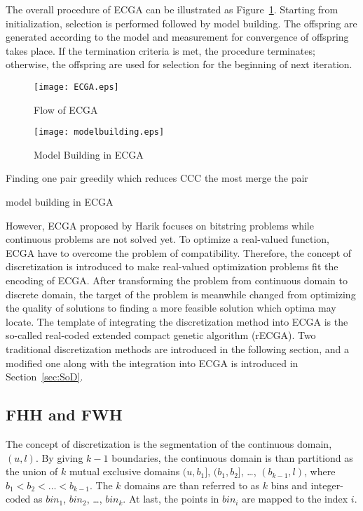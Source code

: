 The overall procedure of ECGA can be illustrated as Figure~\ref{fig:ecgaflow}.
Starting from initialization, selection is performed followed by model
building.
The offspring are generated according to the model and measurement for
convergence of offspring takes place.
If the termination criteria is met, the procedure terminates; otherwise,
the offspring are used for selection for the beginning of next
iteration.

\begin{figure}[htpb]
  \centering
  \texttt{[image: ECGA.eps]}
  \caption{Flow of ECGA}
  \label{fig:ecgaflow}
\end{figure}

\begin{figure}[htpb]
  \centering
  \texttt{[image: modelbuilding.eps]}
  \caption{Model Building in ECGA}
  \label{fig:model building}
\end{figure}
\begin{algorithm}    { Finding one pair greedily which reduces CCC
    the most \; merge the pair\; } \caption{model building in ECGA}
    \label{algo:ecga}
  \end{algorithm}

However, ECGA proposed by Harik focuses on bitstring problems while
continuous problems are not solved yet.  To optimize a real-valued
function, ECGA have to overcome the problem of compatibility.
Therefore, the concept of discretization is introduced to make
real-valued optimization problems fit the encoding of ECGA.  After
transforming the problem from continuous domain to discrete domain, the
target of the problem is meanwhile changed from optimizing the quality
of solutions to finding a more feasible solution which optima may
locate.  The template of integrating the discretization method into ECGA
is the so-called real-coded extended compact genetic algorithm (rECGA).
Two traditional discretization methods are introduced in the following
section, and a modified one along with the integration into ECGA is
introduced in Section~\ref{sec:SoD}.

\subsection{FHH and FWH}

The concept of discretization is the segmentation of the continuous
domain, $(u,l)$.  By giving $k-1$ boundaries, the continuous domain is
than partitiond as the union of $k$ mutual exclusive domains $(u,b_1]$,
$(b_1,b_2]$, \ldots, $(b_{k-1},l)$, where $b_1 < b_2 < \ldots <
b_{k-1}$.  The $k$ domains are than referred to as $k$ bins and
integer-coded as $bin_1$, $bin_2$, \ldots, $bin_k$.  At last, the points
in $bin_i$ are mapped to the index $i$.



